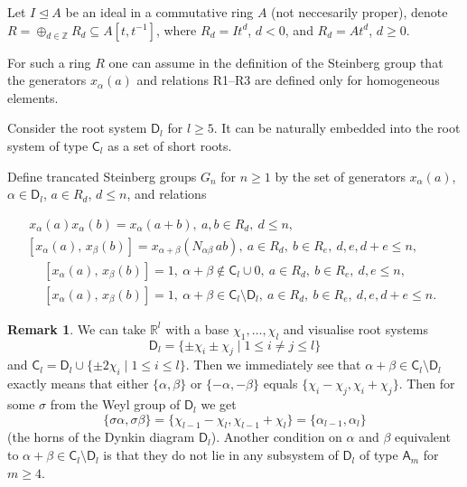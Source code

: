 \documentclass[oneside, 8pt]{amsart}
\theoremstyle{remark}
\theoremstyle{definition}
\newtheorem{rem}[lemma]{Remark}
\newcommand{\inv}{^{-1}}
\newcommand{\rA}{\mathsf{A}}
\newcommand{\rC}{\mathsf{C}}
\newcommand{\rD}{\mathsf{D}}
\numberwithin{equation}{section}
\begin{document}
Let $I\trianglelefteq A$ be an ideal in a commutative ring $A$ (not neccesarily proper), denote $R=\oplus_{d\in\mathbb Z}R_d\subseteq A[t,t\inv]$, where $R_d=It^d$, $d<0$, and $R_d=At^d$, $d\geq0$.

For such a ring $R$ one can assume in the definition of the Steinberg group that the generators $x_\alpha(a)$ and relations R1--R3 are defined only for homogeneous elements. 

Consider the root system $\rD_l$ for $l\geq5$. It can be naturally embedded into the root system of type $\rC_l$ as a set of short roots.

Define trancated Steinberg groups $G_n$ for $n\geq1$ by the set of generators $x_\alpha(a)$, $\alpha\in\rD_l$, $a\in R_d$, $d\leq n$, and relations

\vspace{-15pt}
\setcounter{equation}{0}
\renewcommand{\theequation}{R\arabic{equation}$\!\,_n$}
\begin{align}
&\,\,x_{\alpha}(a)x_{\alpha}(b)=x_{\alpha}(a+b),\ a,b\in R_d,\ d\leq n,\\
&\,[x_{\alpha}(a),\,x_{\beta}(b)]=x_{\alpha+\beta}(N_{\alpha\beta}\,ab),\ a\in R_d,\ b\in R_e,\ d,e,d+e\leq n,\phantom{tttttttt}
\end{align}
\vspace{-35pt}
\setcounter{equation}{0}
\renewcommand{\theequation}{R3.\arabic{equation}$\!\,_n$}
\begin{align}
&[x_{\alpha}(a),\,x_{\beta}(b)]=1,\ \alpha+\beta\not\in\rC_l\cup0,\ a\in R_d,\ b\in R_e,\ d,e\leq n,\\
&[x_{\alpha}(a),\,x_{\beta}(b)]=1,\ \alpha+\beta\in\rC_l\setminus\rD_l,\ a\in R_d,\ b\in R_e,\ d,e,d+e\leq n.
\end{align}

\begin{rem}
We can take $\mathbb R^l$ with a base $\chi_1,\ldots,\chi_l$ and visualise root systems
$$
\rD_l=\{\pm\chi_i\pm\chi_j\mid1\leq i\neq j\leq l\}
$$
and $\rC_l=\rD_l\cup\{\pm2\chi_i\mid1\leq i\leq l\}$. Then we immediately see that $\alpha+\beta\in\rC_l\setminus\rD_l$ exactly means that either $\{\alpha,\beta\}$ or $\{-\alpha,-\beta\}$ equals $\{\chi_i-\chi_j,\chi_i+\chi_j\}$. Then for some $\sigma$ from the Weyl group of $\rD_l$ we get 
$$
\{\sigma\alpha,\sigma\beta\}=\{\chi_{l-1}-\chi_l, \chi_{l-1}+\chi_l\}=\{\alpha_{l-1},\alpha_l\}
$$ 
(the horns of the Dynkin diagram $\rD_l$). Another condition on $\alpha$ and $\beta$ equivalent to $\alpha+\beta\in\rC_l\setminus\rD_l$ is that they do not lie in any subsystem of $\rD_l$ of type $\rA_m$ for $m\geq4$.
\end{rem}
\end{document}
